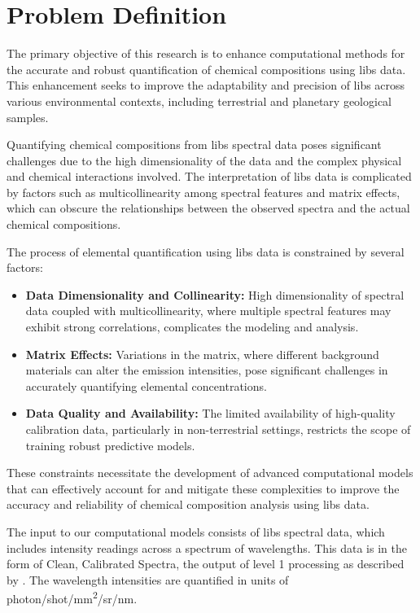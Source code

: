 \section{Problem Definition}\label{sec:problem_definition}
The primary objective of this research is to enhance computational methods for the accurate and robust quantification of chemical compositions using \gls{libs} data.
This enhancement seeks to improve the adaptability and precision of \gls{libs} across various environmental contexts, including terrestrial and planetary geological samples.

Quantifying chemical compositions from \gls{libs} spectral data poses significant challenges due to the high dimensionality of the data and the complex physical and chemical interactions involved. The interpretation of \gls{libs} data is complicated by factors such as multicollinearity among spectral features and matrix effects, which can obscure the relationships between the observed spectra and the actual chemical compositions.

The process of elemental quantification using \gls{libs} data is constrained by several factors:
\begin{itemize}
    \item \textbf{Data Dimensionality and Collinearity:} High dimensionality of spectral data coupled with multicollinearity, where multiple spectral features may exhibit strong correlations, complicates the modeling and analysis\cite{andersonImprovedAccuracyQuantitative2017}.
    \item \textbf{Matrix Effects:} Variations in the matrix, where different background materials can alter the emission intensities, pose significant challenges in accurately quantifying elemental concentrations\cite{cleggRecalibrationMarsScience2017, andersonImprovedAccuracyQuantitative2017}.
    \item \textbf{Data Quality and Availability:} The limited availability of high-quality calibration data, particularly in non-terrestrial settings, restricts the scope of training robust predictive models\cite{p9_paper}.
\end{itemize}

These constraints necessitate the development of advanced computational models that can effectively account for and mitigate these complexities to improve the accuracy and reliability of chemical composition analysis using \gls{libs} data.

The input to our computational models consists of \gls{libs} spectral data, which includes intensity readings across a spectrum of wavelengths. This data is in the form of Clean, Calibrated Spectra\cite{andersonImprovedAccuracyQuantitative2017}, the output of level 1 processing as described by \citet{wiensPreflightCalibrationInitial2013}. The wavelength intensities are quantified in units of photon/shot/mm\textsuperscript{2}/sr/nm.

